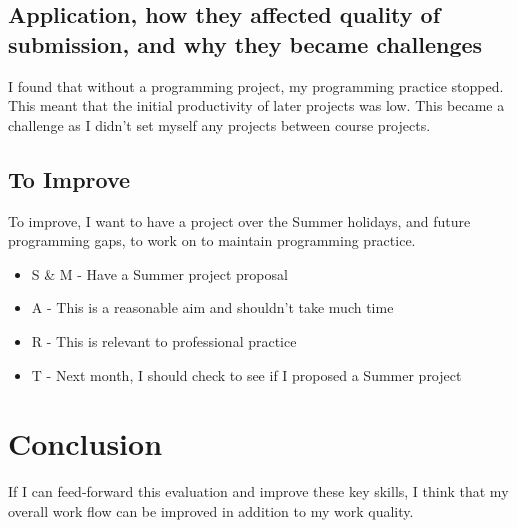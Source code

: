 \documentclass{scrartcl}
\begin{document}
\subsection*{Application, how they affected quality of submission, and why they became challenges}
I found that without a programming project, my programming practice stopped. This meant that the initial productivity of later projects was low. This became a challenge as I didn't set myself any projects between course projects.

\subsection*{To Improve}
To improve, I want to have a project over the Summer holidays, and future programming gaps, to work on to maintain programming practice.

 \begin{itemize}
   \item  S \& M - Have a Summer project proposal
	\item A - This is a reasonable aim and shouldn't take much time
	\item R - This is relevant to professional practice
	\item T - Next month, I should check to see if I proposed a Summer project
 \end{itemize}
 
 \section*{Conclusion}
 If I can feed-forward this evaluation and improve these key skills, I think that my overall work flow can be improved in addition to my work quality.
\end{document}
